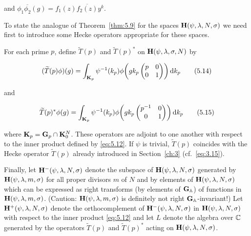 and $\phi_1\overline{\phi_2}(g) = f_1(z)\overline{f_2(z)}y^k$.

To state the analogue of Theorem~\ref{thm:5.9} for the spaces $\mathbf{H}(\psi,\lambda,N,\sigma)$ we need first to introduce some Hecke operators appropriate for these spaces.

For each prime $p$, define $\widetilde{T}(p)$ and $\widetilde{T}(p)^{*}$ on $\mathbf{H}(\psi, \lambda, \sigma, N)$ by

\begin{equation}\label{eq:5.14}
(\widetilde{T}(p)\phi)(g) = \int_{\mathbf{K}_p} \psi^{-1}(k_p) \phi\!\left(gk_p \begin{pmatrix} p & 0 \\ 0 & 1 \end{pmatrix}\right) \mathrm{d} k_p\tag{5.14}
\end{equation}

and

\begin{equation}\label{eq:5.15}
\widetilde{T}(p)^{*}\phi(g) = \int_{\mathbf{K}_p} \psi^{-1}(k_p) \phi\!\left(gk_p \begin{pmatrix} p^{-1} & 0 \\ 0 & 1 \end{pmatrix}\right) \mathrm{d} k_p\tag{5.15}
\end{equation}

where $\mathbf{K}_p = \mathbf{G}_p \cap \mathbf{K}_0^N$. These operators are adjoint to one another with respect to the inner product defined by \eqref{eq:5.12}. If $\psi$ is trivial, $\widetilde{T}(p)$ coincides with the Hecke operator $\widetilde{T}(p)$ already introduced in Section~\ref{ch:3} (cf.\ \eqref{eq:3.15}).

Finally, let $\mathbf{H}^-(\psi, \lambda, N, \sigma)$ denote the subspace of $\mathbf{H}(\psi, \lambda, N, \sigma)$ generated by $\mathbf{H}(\psi, \lambda, m, \sigma)$ for all proper divisors $m$ of $N$ and by elements of $\mathbf{H}(\psi, \lambda, N, \sigma)$ which can be expressed as right transforms (by elements of $\mathbf{G}_{\mathbb{A}}$) of functions in $\mathbf{H}(\psi, \lambda, m, \sigma)$. (Caution: $\mathbf{H}(\psi, \lambda, m, \sigma)$ is definitely not right $\mathbf{G}_{\mathbb{A}}$-invariant!) Let $\mathbf{H}^+(\psi, \lambda, N, \sigma)$ denote the orthocomplement of $\mathbf{H}^-(\psi, \lambda, N, \sigma)$ in $\mathbf{H}(\psi, \lambda, N, \sigma)$ with respect to the inner product \eqref{eq:5.12} and let $L$ denote the algebra over $\mathbb{C}$ generated by the operators $\widetilde{T}(p)$ and $\widetilde{T}(p)^{*}$ acting on $\mathbf{H}(\psi, \lambda, N, \sigma)$.

